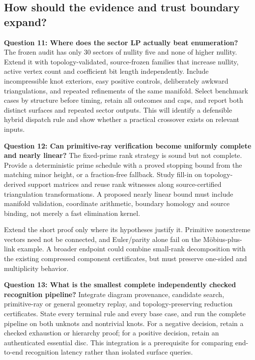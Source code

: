 \subsection{How should the evidence and trust boundary expand?}

\textbf{Question 11: Where does the sector LP actually beat enumeration?}
The frozen audit has only 30 sectors of nullity five and none of higher nullity. Extend it with topology-validated, source-frozen families that increase nullity, active vertex count and coefficient bit length independently. Include incompressible knot exteriors, easy positive controls, deliberately awkward triangulations, and repeated refinements of the same manifold. Select benchmark cases by structure before timing, retain all outcomes and caps, and report both distinct surfaces and repeated sector outputs. This will identify a defensible hybrid dispatch rule and show whether a practical crossover exists on relevant inputs.

\textbf{Question 12: Can primitive-ray verification become uniformly complete and nearly linear?}
The fixed-prime rank strategy is sound but not complete. Provide a deterministic prime schedule with a proved stopping bound from the matching minor height, or a fraction-free fallback. Study fill-in on topology-derived support matrices and reuse rank witnesses along source-certified triangulation transformations. A proposed nearly linear bound must include manifold validation, coordinate arithmetic, boundary homology and source binding, not merely a fast elimination kernel.

Extend the short proof only where its hypotheses justify it. Primitive nonextreme vectors need not be connected, and Euler/parity alone fail on the M\"obius-plus-link example. A broader endpoint could combine small-rank decomposition with the existing compressed component certificates, but must preserve one-sided and multiplicity behavior.

\textbf{Question 13: What is the smallest complete independently checked recognition pipeline?}
Integrate diagram provenance, candidate search, primitive-ray or general geometry replay, and topology-preserving reduction certificates. State every terminal rule and every base case, and run the complete pipeline on both unknots and nontrivial knots. For a negative decision, retain a checked exhaustion or hierarchy proof; for a positive decision, retain an authenticated essential disc. This integration is a prerequisite for comparing end-to-end recognition latency rather than isolated surface queries.

